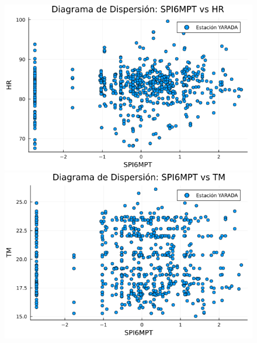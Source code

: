 \begin{figure}[htbp]
\begin{minipage}{0.32\textwidth}
\end{minipage}

\vspace{0.5cm}  %

\begin{minipage}{0.32\textwidth}
    \centering
    \includegraphics[width=\linewidth]{Capitulos/Scaterplot/YARADA_SPI6MPT_vs_HR.png}
\end{minipage}\hfill
\begin{minipage}{0.32\textwidth}
    \centering
    \includegraphics[width=\linewidth]{Capitulos/Scaterplot/YARADA_SPI6MPT_vs_TM.png}
\end{minipage}\hfill
\begin{minipage}{0.32\textwidth}
    \centering

\end{minipage}
\end{figure}
